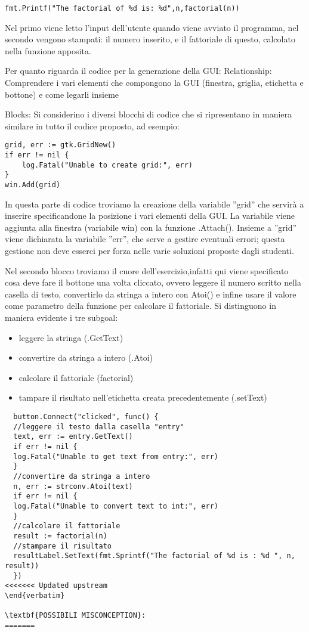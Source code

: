 \begin{lstlisting}
fmt.Printf("The factorial of %d is: %d",n,factorial(n))
\end{lstlisting}

Nel primo viene letto l'input dell'utente quando viene avviato il programma, nel secondo vengono stampati: il numero inserito, e il fattoriale di questo, calcolato nella funzione apposita.

Per quanto riguarda il codice per la generazione della GUI:
Relationship:
Comprendere i vari elementi che compongono la GUI (finestra, griglia, etichetta e bottone) e come legarli insieme

Blocks:
Si considerino i diversi blocchi di codice che si ripresentano in maniera similare in tutto il codice proposto, ad esempio:

\begin{lstlisting}
grid, err := gtk.GridNew()
if err != nil {
    log.Fatal("Unable to create grid:", err)
}
win.Add(grid)
\end{lstlisting}

In questa parte di codice troviamo la creazione della variabile ''grid'' che servirà a inserire specificandone la posizione i vari elementi della GUI. La variabile viene aggiunta alla finestra (variabile win) con la funzione .Attach(). Insieme a ''grid'' viene dichiarata la variabile 
''err'', che serve a gestire eventuali errori; questa gestione non deve esserci per forza nelle varie soluzioni proposte dagli studenti.

Nel secondo blocco  troviamo  il cuore dell'esercizio,infatti qui viene specificato cosa deve fare il bottone una volta cliccato, ovvero leggere il numero scritto nella casella di testo, convertirlo da stringa a intero con Atoi() e infine usare il valore come parametro della funzione per calcolare il fattoriale.
Si distinguono in maniera evidente i tre subgoal: 
\begin{itemize}
\item leggere la stringa (.GetText)
 \item convertire da stringa a intero (.Atoi)
 \item calcolare il fattoriale (factorial)
\item tampare il risultato nell'etichetta creata precedentemente (.setText)
\end{itemize}

\begin{lstlisting}
  button.Connect("clicked", func() {
  //leggere il testo dalla casella "entry"
  text, err := entry.GetText()
  if err != nil {
  log.Fatal("Unable to get text from entry:", err)
  }
  //convertire da stringa a intero
  n, err := strconv.Atoi(text)
  if err != nil {
  log.Fatal("Unable to convert text to int:", err)
  }
  //calcolare il fattoriale
  result := factorial(n)
  //stampare il risultato
  resultLabel.SetText(fmt.Sprintf("The factorial of %d is : %d ", n, result))
  })
<<<<<<< Updated upstream
\end{verbatim}
  
\textbf{POSSIBILI MISCONCEPTION}:
=======
  \end{lstlisting}
  \newpage
